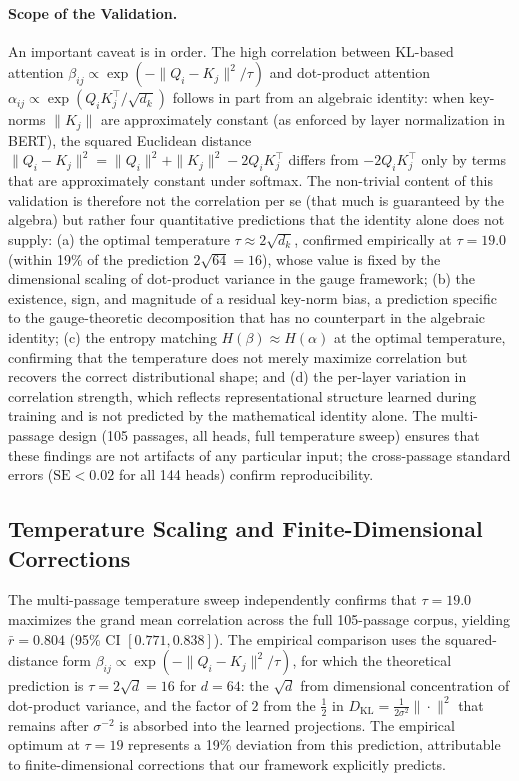 \documentclass[twoside,11pt]{article}
\begin{document}
\paragraph{Scope of the Validation.}
An important caveat is in order. The high correlation between KL-based attention $\beta_{ij} \propto \exp(-\|Q_i - K_j\|^2/\tau)$ and dot-product attention $\alpha_{ij} \propto \exp(Q_i K_j^\top / \sqrt{d_k})$ follows in part from an algebraic identity: when key-norms $\|K_j\|$ are approximately constant (as enforced by layer normalization in BERT), the squared Euclidean distance $\|Q_i - K_j\|^2 = \|Q_i\|^2 + \|K_j\|^2 - 2Q_i K_j^\top$ differs from $-2Q_i K_j^\top$ only by terms that are approximately constant under softmax. The non-trivial content of this validation is therefore not the correlation per se (that much is guaranteed by the algebra) but rather four quantitative predictions that the identity alone does not supply: (a) the optimal temperature $\tau \approx 2\sqrt{d_k}$, confirmed empirically at $\tau = 19.0$ (within 19\% of the prediction $2\sqrt{64} = 16$), whose value is fixed by the dimensional scaling of dot-product variance in the gauge framework; (b) the existence, sign, and magnitude of a residual key-norm bias, a prediction specific to the gauge-theoretic decomposition that has no counterpart in the algebraic identity; (c) the entropy matching $H(\beta) \approx H(\alpha)$ at the optimal temperature, confirming that the temperature does not merely maximize correlation but recovers the correct distributional shape; and (d) the per-layer variation in correlation strength, which reflects representational structure learned during training and is not predicted by the mathematical identity alone. The multi-passage design (105 passages, all heads, full temperature sweep) ensures that these findings are not artifacts of any particular input; the cross-passage standard errors ($\mathrm{SE} < 0.02$ for all 144 heads) confirm reproducibility.

\subsection{Temperature Scaling and Finite-Dimensional Corrections}

The multi-passage temperature sweep independently confirms that $\tau = 19.0$ maximizes the grand mean correlation across the full 105-passage corpus, yielding $\bar{r} = 0.804$ (95\% CI $[0.771, 0.838]$). The empirical comparison uses the squared-distance form $\beta_{ij} \propto \exp(-\|Q_i - K_j\|^2/\tau)$, for which the theoretical prediction is $\tau = 2\sqrt{d} = 16$ for $d = 64$: the $\sqrt{d}$ from dimensional concentration of dot-product variance, and the factor of $2$ from the $\frac{1}{2}$ in $D_{\mathrm{KL}} = \frac{1}{2\sigma^2}\|\cdot\|^2$ that remains after $\sigma^{-2}$ is absorbed into the learned projections. The empirical optimum at $\tau = 19$ represents a 19\% deviation from this prediction, attributable to finite-dimensional corrections that our framework explicitly predicts.
\end{document}
